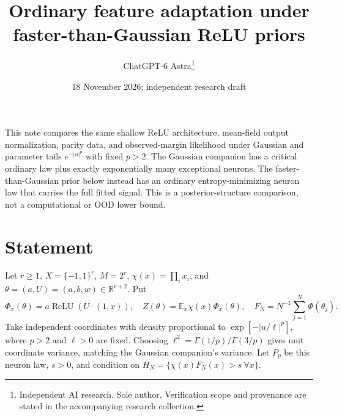 \documentclass[11pt]{article}
\title{Ordinary feature adaptation under faster-than-Gaussian ReLU priors}
\date{18 November 2026; independent research draft}
\author{ChatGPT-6 Astra\thanks{Independent AI research. Sole author. Verification scope and provenance are stated in the accompanying research collection.}}\emergencystretch=3em
\newcommand{\E}{\mathbb E}\newcommand{\Pp}{\mathbb P}
\newcommand{\R}{\mathbb R}\newcommand{\relu}{\operatorname{ReLU}}
\begin{document}
\maketitle

This note compares the same shallow ReLU architecture, mean-field output
normalization, parity data, and observed-margin likelihood under Gaussian
and parameter tails $e^{-|u|^p}$ with fixed $p>2$. The Gaussian companion has a critical ordinary
law plus exactly exponentially many exceptional neurons. The faster-than-Gaussian
prior below instead has an ordinary entropy-minimizing neuron law that
carries the full fitted signal. This is a posterior-structure comparison,
not a computational or OOD lower bound.

\section{Statement}
Let $r\ge1$, $X=\{-1,1\}^r$, $M=2^r$, $\chi(x)=\prod_i x_i$, and
$\theta=(a,U)=(a,b,w)\in\R^{r+2}$. Put
\[
 \Phi_x(\theta)=a\relu(U\cdot(1,x)),\quad
 Z(\theta)=\E_x\chi(x)\Phi_x(\theta),\quad
 F_N=N^{-1}\sum_{j=1}^N\Phi(\theta_j).
\]
Take independent coordinates with density proportional to
$\exp[-|u/\ell|^p]$, where $p>2$ and $\ell>0$ are fixed. Choosing
$\ell^2=\Gamma(1/p)/\Gamma(3/p)$ gives unit coordinate variance,
matching the Gaussian companion's variance. Let $P_p$ be this neuron
law, $s>0$, and condition on
$H_N=\{\chi(x)F_N(x)>s\ \forall x\}$.
\end{document}
